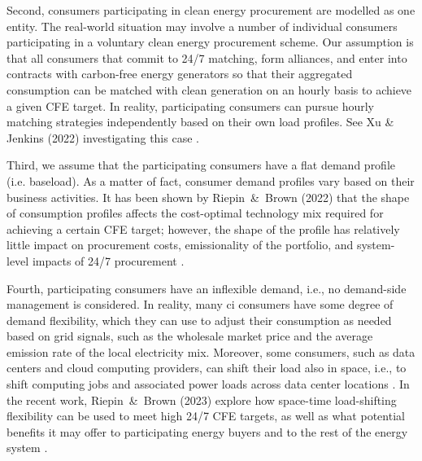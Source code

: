 Second, consumers participating in clean energy procurement are modelled as one entity.
The real-world situation may involve a number of individual consumers participating in a voluntary clean energy procurement scheme.
Our assumption is that all consumers that commit to 24/7 matching, form alliances, and enter into contracts with carbon-free energy generators so that their aggregated consumption can be matched with clean generation on an hourly basis to achieve a given CFE target.
In reality, participating consumers can pursue hourly matching strategies independently based on their own load profiles.
See Xu \& Jenkins (2022) investigating this case \cite{princeton-TEACs-2022}.

Third, we assume that the participating consumers have a flat demand profile (i.e. baseload).
As a matter of fact, consumer demand profiles vary based on their business activities.
It has been shown by Riepin~\&~Brown (2022) that the shape of consumption profiles affects the cost-optimal technology mix required for achieving a certain CFE target; however, the shape of the profile has relatively little impact on procurement costs, emissionality of the portfolio, and system-level impacts of 24/7 procurement \cite{riepin-zenodo-systemlevel247}.

Fourth, participating consumers have an inflexible demand, i.e., no demand-side management is considered.
In reality, many \gls{ci} consumers have some degree of demand flexibility, which they can use to adjust their consumption as needed based on grid signals, such as the wholesale market price and the average emission rate of the local electricity mix.
Moreover, some consumers, such as data centers and cloud computing providers, can shift their load also in space, i.e., to shift computing
jobs and associated power loads across data center locations \cite{rosskoningsteinWeNowMore2021}.
In the recent work, Riepin~\&~Brown (2023) explore how space-time load-shifting flexibility can be used to meet high 24/7 CFE targets, as well as what potential benefits it may offer to participating energy buyers and to the rest of the energy system \cite{riepin-zenodo-spacetime247CFE}.

